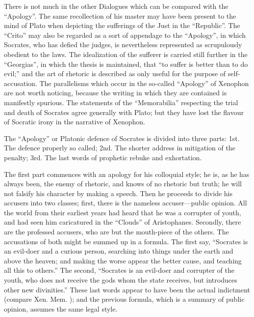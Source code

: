 \documentclass[11pt,letter]{article}
\begin{document}
\par  There is not much in the other Dialogues which can be compared with the “Apology”. The same recollection of his master may have been present to the mind of Plato when depicting the sufferings of the Just in the “Republic”. The “Crito” may also be regarded as a sort of appendage to the “Apology”, in which Socrates, who has defied the judges, is nevertheless represented as scrupulously obedient to the laws. The idealization of the sufferer is carried still further in the “Georgias”, in which the thesis is maintained, that “to suffer is better than to do evil;” and the art of rhetoric is described as only useful for the purpose of self-accusation. The parallelisms which occur in the so-called “Apology” of Xenophon are not worth noticing, because the writing in which they are contained is manifestly spurious. The statements of the “Memorabilia” respecting the trial and death of Socrates agree generally with Plato; but they have lost the flavour of Socratic irony in the narrative of Xenophon.

\par  The “Apology” or Platonic defence of Socrates is divided into three parts: 1st. The defence properly so called; 2nd. The shorter address in mitigation of the penalty; 3rd. The last words of prophetic rebuke and exhortation.

\par  The first part commences with an apology for his colloquial style; he is, as he has always been, the enemy of rhetoric, and knows of no rhetoric but truth; he will not falsify his character by making a speech. Then he proceeds to divide his accusers into two classes; first, there is the nameless accuser—public opinion. All the world from their earliest years had heard that he was a corrupter of youth, and had seen him caricatured in the “Clouds” of Aristophanes. Secondly, there are the professed accusers, who are but the mouth-piece of the others. The accusations of both might be summed up in a formula. The first say, “Socrates is an evil-doer and a curious person, searching into things under the earth and above the heaven; and making the worse appear the better cause, and teaching all this to others.” The second, “Socrates is an evil-doer and corrupter of the youth, who does not receive the gods whom the state receives, but introduces other new divinities.” These last words appear to have been the actual indictment (compare Xen. Mem. ); and the previous formula, which is a summary of public opinion, assumes the same legal style.
\end{document}
